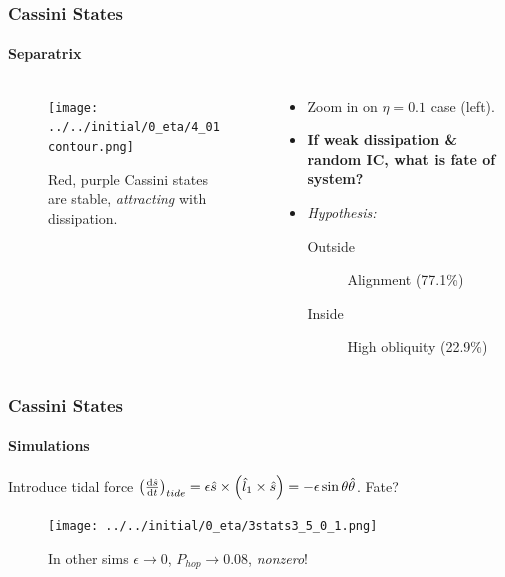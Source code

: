 \documentclass[dvipsnames]{beamer}
\newcommand*{\rd}[2]{\frac{\mathrm{d}#1}{\mathrm{d}#2}}
\DeclarePairedDelimiter\p{\lparen}{\rparen}
\begin{document}
\begin{frame}
    \frametitle{Cassini States}
    \framesubtitle{Separatrix}

    \begin{columns}
        \begin{column}{0.45\textwidth}
            \begin{figure}[t]
                \centering
                \texttt{[image: ../../initial/0\_eta/4\_01contour.png]}
                \caption{Red, purple Cassini states are stable,
                \emph{attracting} with dissipation.}
            \end{figure}
        \end{column}
        \begin{column}{0.45\textwidth}
            \begin{itemize}
                \item Zoom in on $\eta = 0.1$ case (left).

                \item \textbf{If weak dissipation \& random IC,
                    what is fate of system?}

                \item \emph{Hypothesis:}
                    \begin{description}
                        \item[Outside] Alignment (77.1\%)
                        \item[Inside] High obliquity (22.9\%)
                    \end{description}
            \end{itemize}
        \end{column}
    \end{columns}
\end{frame}

\begin{frame}
    \frametitle{Cassini States}
    \framesubtitle{Simulations}

    Introduce tidal force $\p*{\rd{\hat{s}}{t}}_{tide} = \epsilon \hat{s} \times
    \p*{\hat{l}_1 \times \hat{s}} = -\epsilon \sin\theta\hat{\theta}$. Fate?

    \begin{figure}[t]
        \centering
        \texttt{[image: ../../initial/0\_eta/3stats3\_5\_0\_1.png]}
        \caption{In other sims $\epsilon \to 0$, $P_{hop} \to 0.08$, \emph{nonzero}!}
    \end{figure}
\end{frame}
\end{document}
